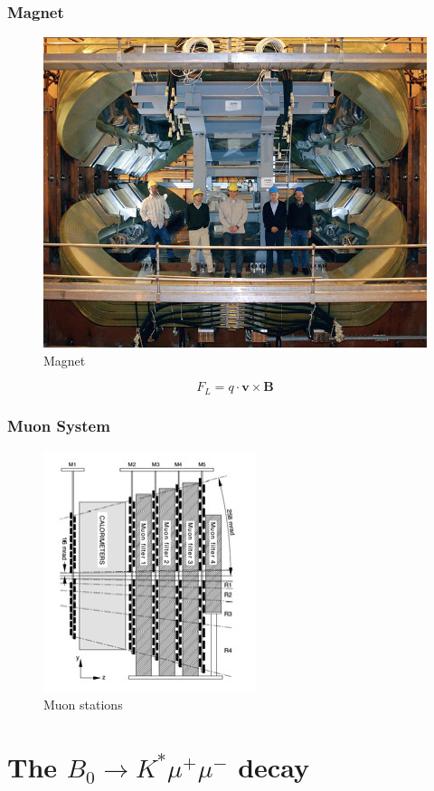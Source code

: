 \documentclass{beamer}
\begin{document}
\begin{frame}
  \frametitle{Magnet}

  \begin{figure}
    \includegraphics[width=0.5\linewidth]{figures/Magnet}
    \caption{Magnet}
  \end{figure}

  \begin{equation*}
    F_{L} = q \cdot \textbf{v} \times \textbf{B}
  \end{equation*}

\end{frame}


\begin{frame}
  \frametitle{Muon System}

  \begin{figure}
    \includegraphics[width=0.4\linewidth]{figures/Muon-diagram}
    \caption{Muon stations}
  \end{figure}

\end{frame}


\section{The $B_0 \rightarrow K^* \mu^+ \mu^-$ decay }
\end{document}
